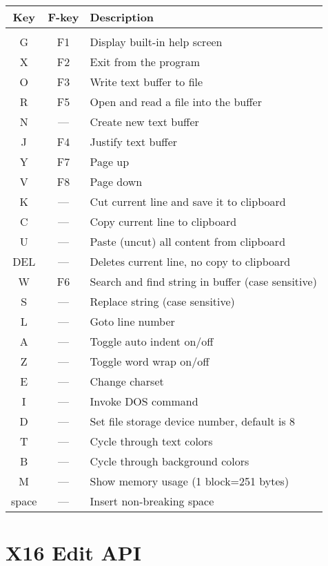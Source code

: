 \documentclass{article}
\begin{document}
    \begin{longtable}[l]{c c l}
        \textbf{Key} & \textbf{F-key} & \textbf{Description} \\
        \hline \\
        G    & F1    & Display built-in help screen \\
        X    & F2    & Exit from the program \\
        O    & F3    & Write text buffer to file \\
        R    & F5    & Open and read a file into the buffer \\
        N    & ---   & Create new text buffer \\
        J    & F4    & Justify text buffer \\
        Y    & F7    & Page up \\
        V    & F8    & Page down \\
        K    & ---   & Cut current line and save it to clipboard \\
        C    & ---   & Copy current line to clipboard \\
        U    & ---   & Paste (uncut) all content from clipboard \\
        DEL  & ---   & Deletes current line, no copy to clipboard \\
        W    & F6    & Search and find string in buffer (case sensitive) \\
        S    & ---   & Replace string (case sensitive) \\
        L    & ---   & Goto line number \\
        A    & ---   & Toggle auto indent on/off \\
        Z    & ---   & Toggle word wrap on/off \\
        E    & ---   & Change charset\\
        I    & ---   & Invoke DOS command\\
        D    & ---   & Set file storage device number, default is 8 \\
        T    &  ---  & Cycle through text colors \\
        B    &  ---  & Cycle through background colors \\
        M    &  ---  & Show memory usage (1 block=251 bytes) \\
        space& ---   & Insert non-breaking space 
    \end{longtable}

\newpage
\section{X16 Edit API}
\end{document}
